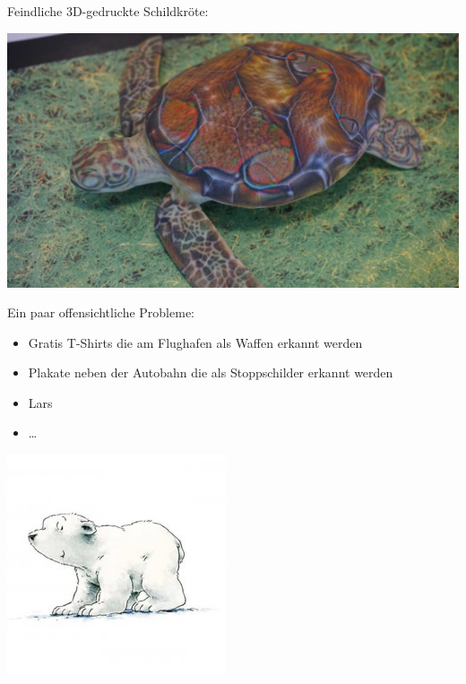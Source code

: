 \documentclass[aspectratio=43]{beamer}
\begin{document}
\begin{frame}

Feindliche 3D-gedruckte Schildkröte:
\bigskip

\includegraphics[scale=0.5]{images/rifle_turtle.jpg} 
\end{frame}


\begin{frame}
Ein paar offensichtliche Probleme:
\bigskip
\begin{multicols}{2}
\begin{itemize}
\pause\item Gratis T-Shirts die am Flughafen als Waffen erkannt werden
\pause\item Plakate neben der Autobahn die als Stoppschilder erkannt werden
\pause\item Lars
\item \dots
\end{itemize}
\columnbreak
\pause
\includegraphics[scale=0.5]{images/lars_eisbaer.png} 
\end{multicols}
\end{frame}
\end{document}
